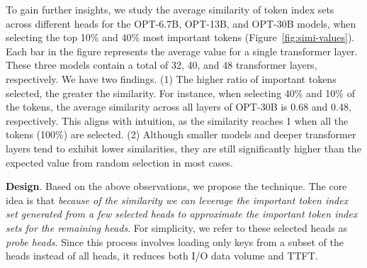 To gain further insights, we study the average similarity of token index sets across different heads for the OPT-6.7B, OPT-13B, and OPT-30B models,
when selecting the top 10\% and 40\%  most important tokens (Figure~\ref{fig:simi-values}). 
Each bar in the figure represents the average value for a single transformer
layer. These three models contain a total of 32, 40, and 48 transformer layers,
respectively. We have two findings.
(1) The higher ratio of important tokens selected, the greater the similarity. For instance, when selecting 40\% and 10\% of the tokens, the average similarity across all layers of OPT-30B is 0.68 and 0.48, respectively. This aligns with intuition, as the similarity reaches 1 when all the tokens (100\%) are selected. 
(2) Although smaller models and deeper transformer layers tend to exhibit lower similarities, they are still significantly higher than the expected value from random selection in most cases. 




\textbf{Design}. Based on the above observations, we propose the \techa{} technique. The core idea is that \textit{because of the similarity we can leverage the important token index set generated from a few selected heads to approximate the important token index sets for the remaining heads}. For simplicity, we refer to these selected heads as \textit{probe heads}. Since this process involves loading only keys from a subset of the heads instead of all heads, it reduces both I/O data volume and TTFT.

